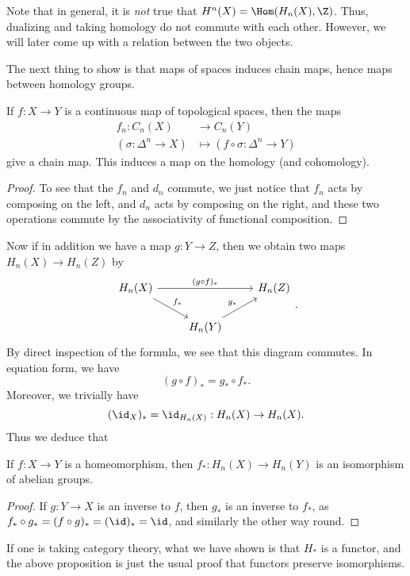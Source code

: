 \documentclass[a4paper]{article}
\theoremstyle{definition}
\begin{document}
Note that in general, it is \emph{not} true that $H^n(X) = \Hom(H_n(X), \Z)$. Thus, dualizing and taking homology do not commute with each other. However, we will later come up with a relation between the two objects.

The next thing to show is that maps of spaces induces chain maps, hence maps between homology groups.

\begin{prop}
  If $f: X \to Y$ is a continuous map of topological spaces, then the maps
  \begin{align*}
    f_n: C_n(X) &\to C_n(Y)\\
    (\sigma: \Delta^n \to X) &\mapsto (f \circ \sigma: \Delta^n \to Y)
  \end{align*}
  give a chain map. This induces a map on the homology (and cohomology).
\end{prop}

\begin{proof}
  To see that the $f_n$ and $d_n$ commute, we just notice that $f_n$ acts by composing on the left, and $d_n$ acts by composing on the right, and these two operations commute by the associativity of functional composition.
\end{proof}

Now if in addition we have a map $g: Y \to Z$, then we obtain two maps $H_n(X) \to H_n(Z)$ by
\[
  \begin{tikzcd}
    H_n(X) \ar[rr, "(g \circ f)_*"] \ar[rd, "f_*"] & & H_n(Z)\\
    & H_n(Y) \ar[ru, "g_*"]
  \end{tikzcd}.
\]
By direct inspection of the formula, we see that this diagram commutes. In equation form, we have
\[
  (g \circ f)_* = g_* \circ f_*.
\]
Moreover, we trivially have
\[
  (\id_X)_* = \id_{H_n(X)}: H_n(X) \to H_n(X).
\]
Thus we deduce that
\begin{prop}
  If $f: X \to Y$ is a homeomorphism, then $f_*: H_n(X) \to H_n(Y)$ is an isomorphism of abelian groups.
\end{prop}

\begin{proof}
  If $g: Y \to X$ is an inverse to $f$, then $g_*$ is an inverse to $f_*$, as $f_* \circ g_* = (f \circ g)_* = (\id)_* = \id$, and similarly the other way round.
\end{proof}
If one is taking category theory, what we have shown is that $H_*$ is a functor, and the above proposition is just the usual proof that functors preserve isomorphisms.
\end{document}
